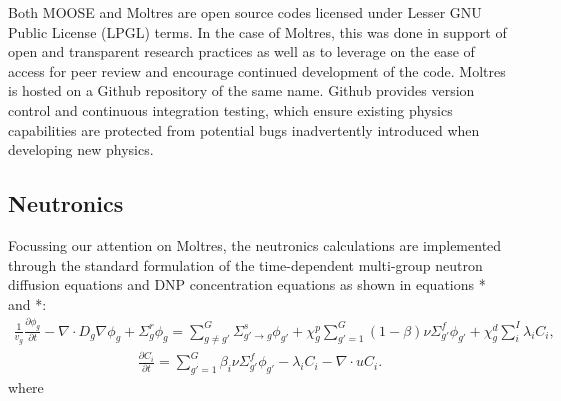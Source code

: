 Both \gls{MOOSE} and Moltres are open source codes licensed under Lesser GNU
Public License (LPGL) terms. In the case of Moltres, this was done in support
of open and transparent research practices as well as to leverage on the ease
of access for peer review and encourage continued development of the code.
Moltres is hosted on a Github repository of the same name. Github provides
version control and continuous integration testing, which ensure existing
physics capabilities are protected from potential bugs inadvertently
introduced when developing new physics.

\subsection{Neutronics}

Focussing our attention on Moltres, the neutronics calculations are
implemented through the standard formulation of the time-dependent multi-group
neutron diffusion equations and \gls{DNP} concentration equations as shown in
equations * and *:
%
\begin{align}
	\frac{1}{v_g} \frac{\partial \phi_g}{\partial t} - \nabla \cdot D_g \nabla
	\phi_g + \Sigma^r_g \phi_g
	= \sum^G_{g \neq g'} \Sigma^s_{g' \rightarrow g} \phi_{g'} + \chi^p_g
	\sum^G_{g'=1} (1-\beta) \nu \Sigma^f_{g'} \phi_{g'} + \chi^d_g \sum^I_i
	\lambda_i C_i, \label{eq1}
\end{align}
%
\begin{align}
	\frac{\partial C_i}{\partial t} = \sum^G_{g'=1} \beta_i \nu \Sigma^f_{g'}
	\phi_{g'} - \lambda_i C_i - \nabla \cdot u C_i. \label{eq2}
\end{align}
%
where
